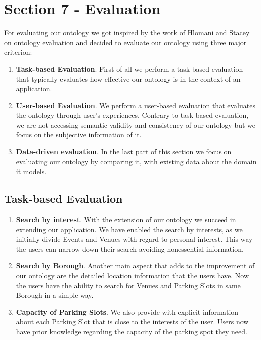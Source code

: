 \documentclass[runningheads,a4paper]{../../StyleFiles/llncs}
\begin{document}
\section{Section 7 - Evaluation}
For evaluating our ontology we got inspired by the work of Hlomani and Stacey \cite{hlomani2014approaches} on ontology evaluation and decided to evaluate our ontology using three major criterion:
\begin{enumerate}
	\item \textbf{Task-based Evaluation}. First of all we perform a task-based evaluation that typically evaluates how effective our ontology is in the context of an application.
	\item \textbf{User-based Evaluation}. We perform a user-based evaluation that evaluates the ontology through user's experiences. Contrary to task-based evaluation, we are not accessing semantic validity and consistency of our ontology but we focus on the subjective information of it.
	\item \textbf{Data-driven evaluation}. In the last part of this section we focus on evaluating our ontology by comparing it, with existing data about the domain it models.
\end{enumerate} 

\subsection{Task-based Evaluation}
\begin{enumerate}
	\item \textbf{Search by interest}.
	With the extension of our ontology we succeed in extending our application. We have enabled the search by interests, as we initially divide Events and Venues with regard to personal interest. This way the users can narrow down their search avoiding nonessential information.
	
	\item \textbf{Search by Borough}. Another main aspect that adds to the improvement of our ontology are the detailed location information that the users have. Now the users have the ability to search for Venues and Parking Slots in same Borough in a simple way.
	
	\item \textbf{Capacity of Parking Slots}. We also provide with explicit information about each Parking Slot that is close to the interests of the user. Users now have prior knowledge regarding the capacity of the parking spot they need.
\end{enumerate}
\end{document}
